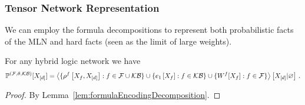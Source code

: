 


%



\subsubsection{Tensor Network Representation}


We can employ the formula decompositions to represent both probabilistic facts of the MLN and hard facts (seen as the limit of large weights).

\begin{theorem}\label{the:hybridNetworkRepresentation}
	For any hybrid logic network we have
	\begin{align*}
		\mathbb{P}^{(\mathcal{F},\theta,\mathcal{KB})}[X_{[d]}] 
		= \left\langle 
		\{\rho^{f}\left[X_{f},X_{[d]}\right] : f\in\mathcal{F}\cup\mathcal{KB} \}
		\cup \{e_{1}\left[X_{f}\right] : f\in\mathcal{KB} \}
		\cup \{W^{f}[X_{f}] : f\in\mathcal{F} \}
		\right\rangle \left[ X_{[d]} | \varnothing \right] \, . 
	\end{align*}
\end{theorem}
\begin{proof}
	By Lemma~\ref{lem:formulaEncodingDecomposition}.
\end{proof}

